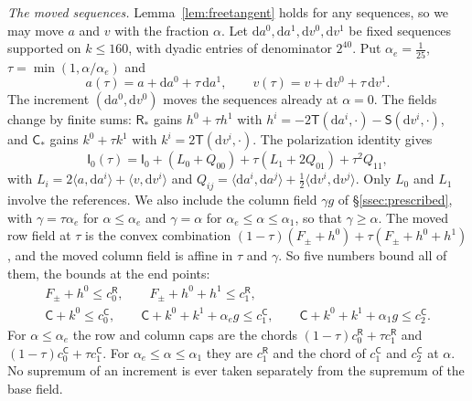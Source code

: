 \emph{The moved sequences.} Lemma~\ref{lem:freetangent} holds for any sequences, so we may move $a$ and $v$ with the
fraction $\alpha$. Let $\mathrm da^0,\mathrm da^1,\mathrm dv^0,\mathrm dv^1$ be fixed sequences supported on $k\le160$, with
dyadic entries of denominator $2^{40}$. Put $\alpha_e=\frac1{25}$, $\tau=\min(1,\alpha/\alpha_e)$ and
\[
 a(\tau)=a+\mathrm da^0+\tau\,\mathrm da^1,\qquad v(\tau)=v+\mathrm dv^0+\tau\,\mathrm dv^1 .
\]
The increment $(\mathrm da^0,\mathrm dv^0)$ moves the sequences already at $\alpha=0$. The fields change by finite sums:
$\mathsf R_*$ gains $h^0+\tau h^1$ with $h^i=-2\mathsf T(\mathrm da^i,\cdot)-\mathsf S(\mathrm dv^i,\cdot)$, and $\mathsf C_*$ gains
$k^0+\tau k^1$ with $k^i=2\mathsf T(\mathrm dv^i,\cdot)$. The polarization identity gives
\[
 \mathsf I_0(\tau)=\mathsf I_0+(L_0+Q_{00})+\tau(L_1+2Q_{01})+\tau^2Q_{11},
\]
with $L_i=2\langle a,\mathrm da^i\rangle+\langle v,\mathrm dv^i\rangle$ and
$Q_{ij}=\langle\mathrm da^i,\mathrm da^j\rangle+\frac12\langle\mathrm dv^i,\mathrm dv^j\rangle$. Only $L_0$ and $L_1$ involve the
references. We also include the column field $\gamma g$ of \S\ref{ssec:prescribed}, with $\gamma=\tau\alpha_e$ for $\alpha\le\alpha_e$
and $\gamma=\alpha$ for $\alpha_e\le\alpha\le\alpha_1$, so that $\gamma\ge\alpha$. The moved row field at $\tau$ is the convex
combination $(1-\tau)(F_\pm+h^0)+\tau(F_\pm+h^0+h^1)$, and the moved column field is affine in $\tau$ and $\gamma$. So five
numbers bound all of them, the bounds at the end points:
\begin{gather*}
 F_\pm+h^0\le c^{\mathsf R}_0,\qquad F_\pm+h^0+h^1\le c^{\mathsf R}_1,\\
 \mathsf C+k^0\le c^{\mathsf C}_0,\qquad \mathsf C+k^0+k^1+\alpha_eg\le c^{\mathsf C}_1,\qquad \mathsf C+k^0+k^1+\alpha_1g\le c^{\mathsf C}_2 .
\end{gather*}
For $\alpha\le\alpha_e$ the row and column caps are the chords $(1-\tau)c^{\mathsf R}_0+\tau c^{\mathsf R}_1$ and
$(1-\tau)c^{\mathsf C}_0+\tau c^{\mathsf C}_1$. For $\alpha_e\le\alpha\le\alpha_1$ they are $c^{\mathsf R}_1$ and the chord of
$c^{\mathsf C}_1$ and $c^{\mathsf C}_2$ at $\alpha$. No supremum of an increment is ever taken separately from the supremum of the base field.

